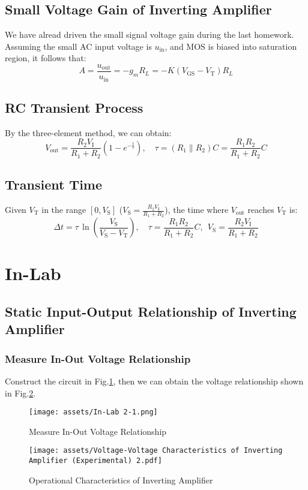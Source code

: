 \documentclass[UTF8]{article}
\theoremstyle{MyLineTheoremStyle} %
\theoremstyle{MyBlockTheoremStyle} %
\theoremstyle{MySubsubsectionStyle} %
\begin{document}
\subsection{Small Voltage Gain of Inverting Amplifier}
We have alread driven the small signal voltage gain during the last homework. Assuming the small AC input voltage is $u_{\text{in}}$, and MOS is biased into saturation region, it follows that:
\begin{equation}
A = \frac{u_{\text{out}}}{u_{\text{in}}} = -g_m R_L = - K \left(V_\text{GS} - V_\text{T}\right)R_L
\end{equation}


\subsection{RC Transient Process}
By the three-element method, we can obtain:
\begin{equation}
V_\text{out} = \frac{R_2 V_\text{I}}{R_1 + R_2} \left( 1 - e^{-\frac{t}{\tau}}\right),\quad \tau = \left(R_1 \parallel R_2 \right) C = \frac{R_1 R_2}{R_1 + R_2} C
\end{equation}
\subsection{Transient Time}
Given $V_\text{T}$ in the range $[0, V_\text{S}]$ ($ V_\text{S} = \frac{R_2 V_{\text{I}}}{R_1 + R_2}$), the time where $V_\text{out}$ reaches $V_\text{T}$ is:
\begin{equation}
\Delta t = \tau \,\ln \left( \frac{V_\text{S}}{V_\text{S} - V_\text{T}} \right),\quad \tau = \frac{R_1 R_2}{R_1 + R_2} C,\ \ V_\text{S} = \frac{R_2 V_{\text{I}}}{R_1 + R_2}
\end{equation}

\section{In-Lab}
\subsection{Static Input-Output Relationship of Inverting Amplifier}
\subsubsection{Measure In-Out Voltage Relationship}\label{sec.voltage}
Construct the circuit in Fig.\ref{In-Lab 2-1}, then we can obtain the voltage relationship shown in Fig.\ref{Operational Characteristics}.
\begin{figure}[H]\centering
    \texttt{[image: assets/In-Lab 2-1.png]}
    \caption{Measure In-Out Voltage Relationship}
    \label{In-Lab 2-1}
\end{figure}
\begin{figure}[H]\centering
    \texttt{[image: assets/Voltage-Voltage Characteristics of Inverting Amplifier (Experimental) 2.pdf]}
    \caption{Operational Characteristics of Inverting Amplifier}
    \label{Operational Characteristics}
\end{figure}
\end{document}

